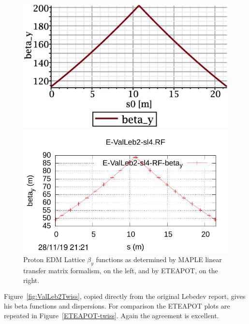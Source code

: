 \documentclass[12]{article}
\begin{document}
\begin{figure}[h]
\begin{minipage}{0.5\linewidth}
\centering
\includegraphics[scale=0.4]{betay_1cell.eps}
\end{minipage}
\begin{minipage}{0.5\linewidth}
\centering
\includegraphics[scale=0.7]{E-ValLeb2-sl4-RF-betay.pdf}
\end{minipage}
\caption{\label{WollnikVsETEAPOT-y}Proton EDM Lattice $\beta_y$ functions as determined by
MAPLE linear transfer matrix formalism, on the left, and by ETEAPOT, on the right.}
\end{figure}

\clearpage

Figure~\ref{fig:ValLeb2Twiss}, copied directly from the original Lebedev report,
gives his beta functions and dispersions. For comparison the ETEAPOT plots
are repeated in Figure~\ref{ETEAPOT-twiss}. Again the agreement is excellent.
\end{document}
